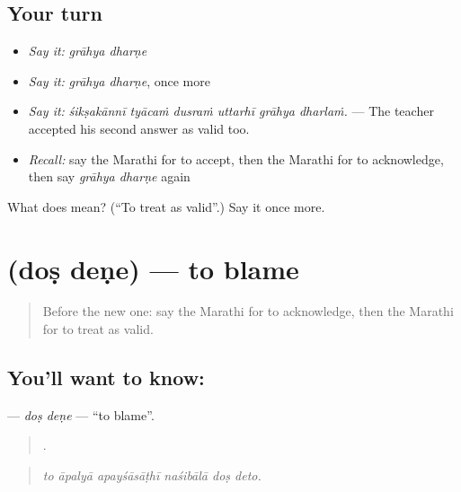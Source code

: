 \subsection*{Your turn}
\begin{itemize}
\raggedright
  \item \emph{Say it:} \emph{grāhya dharṇe}
  \item \emph{Say it:} \emph{grāhya dharṇe}, once more
  \item \emph{Say it:} \emph{śikṣakānnī tyācaṁ dusraṁ uttarhī grāhya dharlaṁ.} — The teacher accepted his second answer as valid too.
  \item \emph{Recall:} say the Marathi for to accept, then the Marathi for to acknowledge, then say \emph{grāhya dharṇe} again
\end{itemize}

\begin{tcolorbox}[breakable,colback=teal!4,colframe=teal!35!black,title={Before you move on}]
What does   mean? (\textquotedblleft{}To treat as valid\textquotedblright{}.) Say it once more.
\end{tcolorbox}
\section[\texorpdfstring{\mr{दोष} \mr{देणे} (doṣ deṇe)}{दोष देणे (doṣ deṇe)}]{  (doṣ deṇe) — to blame}

\label{lesson:MR-C350-dos-dene}



\begin{quote}
Before the new one: say the Marathi for to acknowledge, then the Marathi for to treat as valid.
\end{quote}

\subsection*{You'll want to know:  }
\textbf{ } — \emph{doṣ deṇe} — \textquotedblleft{}to blame\textquotedblright{}.

\begin{quote}
     .
\end{quote}

\begin{quote}
\emph{to āpalyā apayśāsāṭhī naśibālā doṣ deto.}
\end{quote}

